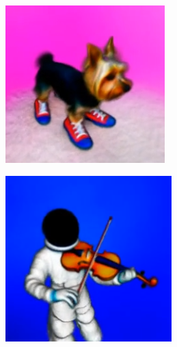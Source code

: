 
\begin{figure}[ht]
    \centering
    \small
    \begin{subfigure}[b]{0.3\textwidth}
        \centering
        \includegraphics[width=\textwidth]{figures/appendix/dreamfusion_a_yorkie_dog_wearing_extremely_cool_sneakers.PNG}
        \caption{}
    \end{subfigure}
    \begin{subfigure}[b]{0.3\textwidth}
        \centering
        \includegraphics[width=\textwidth]{figures/appendix/dreamfusion_an_astronaut_playing_the_violin.PNG}

\end{subfigure}
\end{figure}
